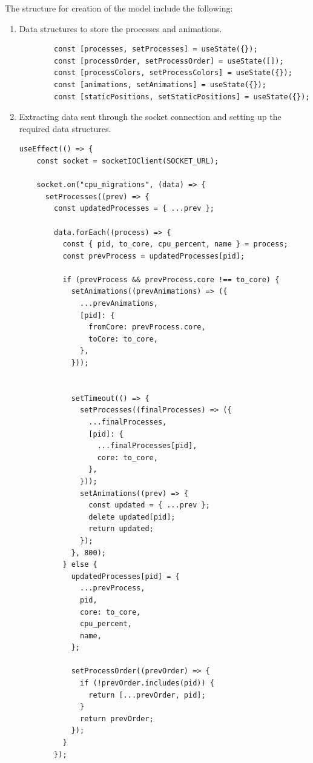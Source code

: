 \documentclass[12pt]{article}
\begin{document}
The structure for creation of the model include the following:
\begin{enumerate}
    \item Data structures to store the processes and animations.
    \begin{verbatim}
        const [processes, setProcesses] = useState({});
        const [processOrder, setProcessOrder] = useState([]); 
        const [processColors, setProcessColors] = useState({});
        const [animations, setAnimations] = useState({});
        const [staticPositions, setStaticPositions] = useState({});
    \end{verbatim}
    \item Extracting data sent through the socket connection and setting up the required data structures. 
\begin{verbatim}
useEffect(() => {
    const socket = socketIOClient(SOCKET_URL);

    socket.on("cpu_migrations", (data) => {
      setProcesses((prev) => {
        const updatedProcesses = { ...prev };

        data.forEach((process) => {
          const { pid, to_core, cpu_percent, name } = process;
          const prevProcess = updatedProcesses[pid];

          if (prevProcess && prevProcess.core !== to_core) {
            setAnimations((prevAnimations) => ({
              ...prevAnimations,
              [pid]: {
                fromCore: prevProcess.core,
                toCore: to_core,
              },
            }));

            
            setTimeout(() => {
              setProcesses((finalProcesses) => ({
                ...finalProcesses,
                [pid]: {
                  ...finalProcesses[pid],
                  core: to_core,
                },
              }));
              setAnimations((prev) => {
                const updated = { ...prev };
                delete updated[pid];
                return updated;
              });
            }, 800); 
          } else {
            updatedProcesses[pid] = {
              ...prevProcess,
              pid,
              core: to_core,
              cpu_percent,
              name,
            };

            setProcessOrder((prevOrder) => {
              if (!prevOrder.includes(pid)) {
                return [...prevOrder, pid];
              }
              return prevOrder;
            });
          }
        });


\end{verbatim}
\end{enumerate}
\end{document}
